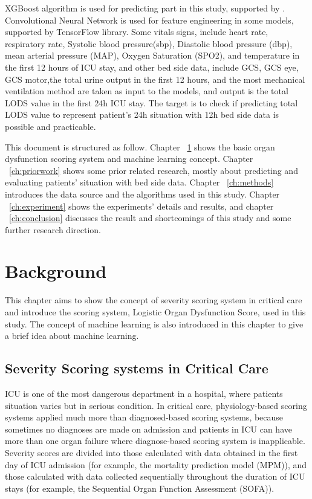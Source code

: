 \documentclass[12pt,a4paper,english
]{tunithesis}
\begin{document}
XGBoost algorithm is used for predicting part in this study, supported by \textcite{xgboost_lib}. Convolutional Neural Network is used for feature engineering in some models, supported by TensorFlow library. Some vitals signs, include heart rate, respiratory rate, Systolic blood pressure(sbp), Diastolic blood pressure (dbp), mean arterial pressure (MAP), Oxygen Saturation (SPO2), and temperature in the first 12 hours of ICU stay, and other bed side data, include GCS, GCS eye, GCS motor,the total urine output in the first 12 hours, and the most mechanical ventilation method are taken as input to the models, and output is the total LODS value in the first 24h ICU stay. The target is to check if predicting total LODS value to represent patient's 24h situation with 12h bed side data is possible and practicable.

This document is structured as follow. Chapter ~\ref{ch:background} shows the basic organ dysfunction scoring system and machine learning concept. Chapter ~\ref{ch:priorwork} shows some prior related research, mostly about predicting and evaluating patients' situation with bed side data. Chapter ~\ref{ch:methods} introduces the data source and the algorithms used in this study. Chapter ~\ref{ch:experiment} shows the experiments' details and results, and chapter ~\ref{ch:conclusion} discusses the result and shortcomings of this study and some further research direction.


\chapter{Background}
\label{ch:background}
This chapter aims to show the concept of severity scoring system in critical care and introduce the scoring system, Logistic Organ Dysfunction Score, used in this study. The concept of machine learning is also introduced in this chapter to give a brief idea about machine learning.

\section{Severity Scoring systems in Critical Care}
ICU is one of the most dangerous department in a hospital, where patients situation varies but in serious condition. In critical care, physiology-based scoring systems applied much more than diagnosed-based scoring systems, because sometimes no diagnoses are made on admission and patients in ICU can have more than one organ failure where diagnose-based scoring system is inapplicable. \parencite{Bouch2008} Severity scores are divided into those calculated with data obtained in the first day of ICU admission (for example, the mortality prediction model (MPM)), and those calculated with data collected sequentially throughout the duration of ICU stays (for example, the Sequential Organ Function Assessment (SOFA)). 
\end{document}
